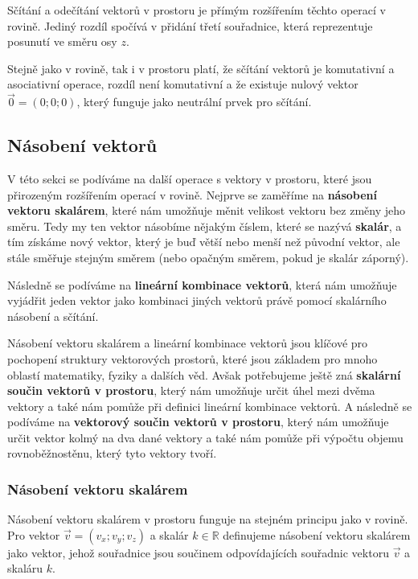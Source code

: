 \begin{remark}
    Sčítání a odečítání vektorů v prostoru je přímým rozšířením těchto operací v rovině.
    Jediný rozdíl spočívá v přidání třetí souřadnice, která reprezentuje posunutí ve směru osy $z$.

    Stejně jako v rovině, tak i v prostoru platí, že sčítání vektorů je komutativní a asociativní operace, 
    rozdíl není komutativní a že existuje nulový vektor $\vec{0} = (0; 0; 0)$, 
    který funguje jako neutrální prvek pro sčítání.
\end{remark}



\subsection{Násobení vektorů}\label{subsec:Vector_multiplication_in_space}
V této sekci se podíváme na další operace s vektory v prostoru, které jsou přirozeným rozšířením operací v rovině.
Nejprve se zaměříme na \textbf{násobení vektoru skalárem}, které nám umožňuje měnit velikost vektoru bez změny jeho směru.
Tedy my ten vektor násobíme nějakým číslem, které se nazývá \textbf{skalár}, a tím získáme nový vektor, který je buď větší nebo menší než původní vektor, ale stále směřuje stejným směrem (nebo opačným směrem, pokud je skalár záporný).

Následně se podíváme na \textbf{lineární kombinace vektorů}, která nám umožňuje vyjádřit jeden vektor jako kombinaci jiných vektorů právě pomocí skalárního násobení a sčítání.

Násobení vektoru skalárem a lineární kombinace vektorů jsou klíčové pro pochopení struktury vektorových prostorů, které jsou základem pro mnoho oblastí matematiky, fyziky a dalších věd.
Avšak potřebujeme ještě zná \textbf{skalární součin vektorů v prostoru}, který nám umožňuje určit úhel mezi dvěma vektory a také nám pomůže při definici lineární kombinace vektorů.
A následně se podíváme na \textbf{vektorový součin vektorů v prostoru}, který nám umožňuje určit vektor kolmý na dva dané vektory a také nám pomůže při výpočtu objemu rovnoběžnostěnu, který tyto vektory tvoří.

\subsubsection{Násobení vektoru skalárem}\label{subsubsec:Vector_multiplication_by_scalar_in_space}
Násobení vektoru skalárem v prostoru funguje na stejném principu jako v rovině.
Pro vektor $\vec{v} = (v_x; v_y; v_z)$ a skalár $k \in \mathbb{R}$ definujeme násobení vektoru skalárem jako vektor, jehož souřadnice jsou součinem odpovídajících souřadnic vektoru $\vec{v}$ a skaláru $k$.

